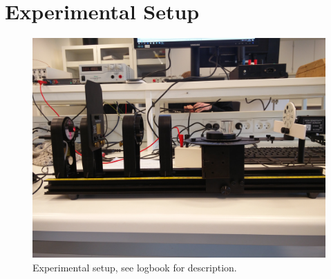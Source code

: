 \section{Experimental Setup}

\begin{figure}[h]
    \centering
    \includegraphics[width=\textwidth]{setup}
    \caption{Experimental setup, see logbook for description.}
    \label{fig:setup}
\end{figure}

